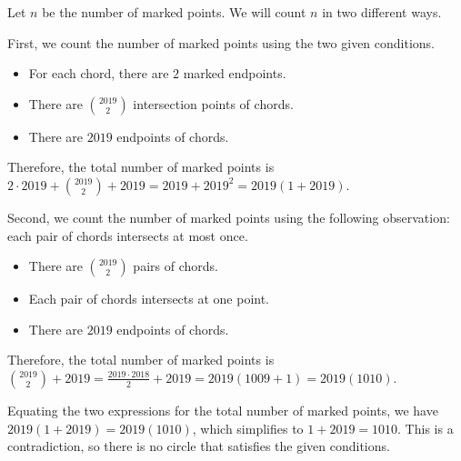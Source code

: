 Let $n$ be the number of marked points. We will count $n$ in two different ways.

First, we count the number of marked points using the two given conditions. 
\begin{itemize}
    \item For each chord, there are $2$ marked endpoints.
    \item There are $\binom{2019}{2}$ intersection points of chords.
    \item There are $2019$ endpoints of chords.
\end{itemize}
Therefore, the total number of marked points is $2 \cdot 2019 + \binom{2019}{2} + 2019 = 2019 + 2019^2 = 2019(1+2019)$.

Second, we count the number of marked points using the following observation: each pair of chords intersects at most once. 
\begin{itemize}
    \item There are $\binom{2019}{2}$ pairs of chords.
    \item Each pair of chords intersects at one point.
    \item There are $2019$ endpoints of chords.
\end{itemize}
Therefore, the total number of marked points is $\binom{2019}{2} + 2019 = \frac{2019 \cdot 2018}{2} + 2019 = 2019(1009 + 1) = 2019(1010)$.

Equating the two expressions for the total number of marked points, we have $2019(1+2019) = 2019(1010)$, which simplifies to $1+2019 = 1010$. This is a contradiction, so there is no circle that satisfies the given conditions.

